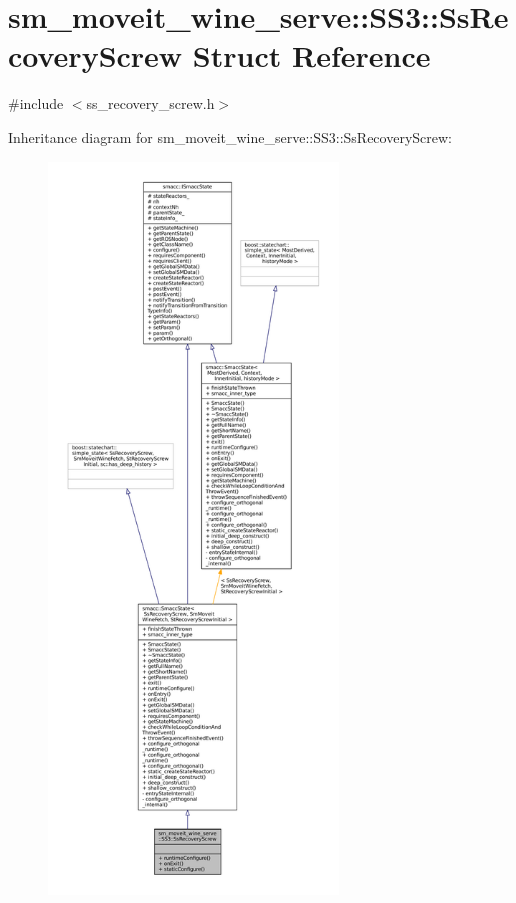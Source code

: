 \hypertarget{structsm__moveit__wine__serve_1_1SS3_1_1SsRecoveryScrew}{}\section{sm\+\_\+moveit\+\_\+wine\+\_\+serve\+:\+:S\+S3\+:\+:Ss\+Recovery\+Screw Struct Reference}
\label{structsm__moveit__wine__serve_1_1SS3_1_1SsRecoveryScrew}


{\ttfamily \#include $<$ss\+\_\+recovery\+\_\+screw.\+h$>$}



Inheritance diagram for sm\+\_\+moveit\+\_\+wine\+\_\+serve\+:\+:S\+S3\+:\+:Ss\+Recovery\+Screw\+:
\nopagebreak
\begin{figure}[H]
\begin{center}
\leavevmode
\includegraphics[height=550pt]{structsm__moveit__wine__serve_1_1SS3_1_1SsRecoveryScrew__inherit__graph}
\end{center}
\end{figure}


